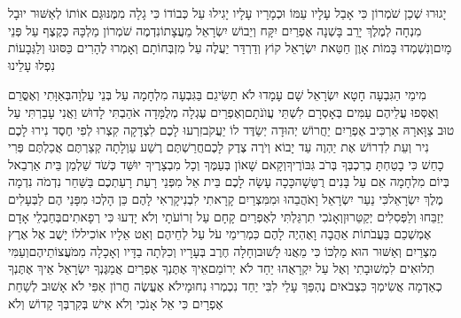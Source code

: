 \documentclass[../main/main.tex]{subfiles}
\begin{document}
\begin{multicols}{\ncols}
יָגוּרוּ שְׁכַן שֹׁמְרוֹן כִּי אָבַל עָלָיו עַמּוֹ וּכְמָרָיו עָלָיו יָגִילוּ עַל כְּבוֹדוֹ כִּי גָלָה מִמֶּנּוּ\PreVerseSpace{}גַּם אוֹתוֹ לְאַשּׁוּר יוּבָל מִנְחָה לְמֶלֶךְ יָרֵב בָּשְׁנָה אֶפְרַיִם יִקָּח וְיֵבוֹשׁ יִשְׂרָאֵל מֵעֲצָתוֹ\PreVerseSpace{}נִדְמֶה שֹׁמְרוֹן מַלְכָּהּ כְּקֶצֶף עַל פְּנֵי מָיִם\PreVerseSpace{}וְנִשְׁמְדוּ בָּמוֹת אָוֶן חַטַּאת יִשְׂרָאֵל קוֹץ וְדַרְדַּר יַעֲלֶה עַל מִזְבְּחוֹתָם וְאָמְרוּ לֶהָרִים כַּסּוּנוּ וְלַגְּבָעוֹת נִפְלוּ עָלֵינוּ\OpenSection{}\par
{}מִימֵי הַגִּבְעָה חָטָא\SubEnd{} יִשְׂרָאֵל שָׁם עָמָדוּ לֹא תַשִּׂיגֵם בַּגִּבְעָה מִלְחָמָה עַל בְּנֵי עַלְוָה\PreVerseSpace{}בְּאַוָּתִי וְאֶסֳּרֵם וְאֻסְּפוּ עֲלֵיהֶם עַמִּים בְּאָסְרָם לִשְׁתֵּי עֲוֺנֹתָם\SubEnd{}\PreVerseSpace{}וְאֶפְרַיִם עֶגְלָה מְלֻמָּדָה אֹהַבְתִּי לָדוּשׁ וַאֲנִי עָבַרְתִּי עַל טוּב צַוָּארָהּ אַרְכִּיב אֶפְרַיִם יַחֲרוֹשׁ יְהוּדָה יְשַׂדֶּד לוֹ יַעֲקֹב\PreVerseSpace{}זִרְעוּ לָכֶם לִצְדָקָה קִצְרוּ לְפִי חֶסֶד נִירוּ לָכֶם נִיר וְעֵת לִדְרוֹשׁ אֶת יַהְוֶה עַד יָבוֹא וְיֹרֶה צֶדֶק לָכֶם\PreVerseSpace{}חֲרַשְׁתֶּם רֶשַׁע עַוְלָתָה קְצַרְתֶּם אֲכַלְתֶּם פְּרִי כָחַשׁ כִּי בָטַחְתָּ בְרִכְבְּךָ\SubEnd{} בְּרֹב גִּבּוֹרֶיךָ\PreVerseSpace{}וְקָאם שָׁאוֹן בְּעַמֶּךָ וְכָל מִבְצָרֶיךָ יוּשַּׁד כְּשֹׁד שַׁלְמַן בֵּית אַרְבֵאל בְּיוֹם מִלְחָמָה אֵם עַל בָּנִים רֻטָּשָׁה\PreVerseSpace{}כָּכָה עָשָׂה לָכֶם בֵּית אֵל מִפְּנֵי רָעַת רָעַתְכֶם בַּשַּׁחַר נִדְמֹה נִדְמָה מֶלֶךְ יִשְׂרָאֵל\PreChapterSpace{}כִּי נַעַר יִשְׂרָאֵל וָאֹהֲבֵהוּ וּמִמִּצְרַיִם קָרָאתִי לִבְנִי\PreVerseSpace{}קָרְאִי\SubEnd{} לָהֶם כֵּן הָלְכוּ מִפָּנַי הֶם\SubEnd{} לַבְּעָלִים יְזַבֵּחוּ וְלַפְּסִלִים יְקַטֵּרוּן\PreVerseSpace{}וְאָנֹכִי תִרְגַּלְתִּי לְאֶפְרַיִם קָחָם עַל זְרוֹעֹתָי\SubEnd{} וְלֹא יָדְעוּ כִּי רְפָאתִים\PreVerseSpace{}בְּחַבְלֵי אָדָם אֶמְשְׁכֵם בַּעֲבֹתוֹת אַהֲבָה וָאֶהְיֶה לָהֶם כִּמְרִימֵי עֹל עַל לְחֵיהֶם וְאַט אֵלָיו אוֹכִיל\PreVerseSpace{}לוֹ\SubEnd{} יָשֻׁב אֶל אֶרֶץ מִצְרַיִם וְאַשּׁוּר הוּא מַלְכּוֹ כִּי מֵאֲנוּ לָשׁוּב\PreVerseSpace{}וְחָלָה חֶרֶב בְּעָרָיו וְכִלְּתָה בַדָּיו וְאָכָלָה מִמֹּעֲצוֹתֵיהֶם\PreVerseSpace{}וְעַמִּי תְלוּאִים לִמְשׁוּבָתִי וְאֶל עַל יִקְרָאֻהוּ יַחַד לֹא יְרוֹמֵם\PreVerseSpace{}אֵיךְ אֶתֶּנְךָ אֶפְרַיִם אֲמַגֶּנְךָ יִשְׂרָאֵל אֵיךְ אֶתֶּנְךָ כְאַדְמָה אֲשִׂימְךָ כִּצְבֹאיִם נֶהְפַּךְ עָלַי לִבִּי יַחַד נִכְמְרוּ נִחוּמָי\PreVerseSpace{}לֹא אֶעֱשֶׂה חֲרוֹן אַפִּי לֹא אָשׁוּב לְשַׁחֵת אֶפְרָיִם כִּי אֵל אָנֹכִי וְלֹא אִישׁ בְּקִרְבְּךָ קָדוֹשׁ וְלֹא 
\end{multicols}
\end{document}
